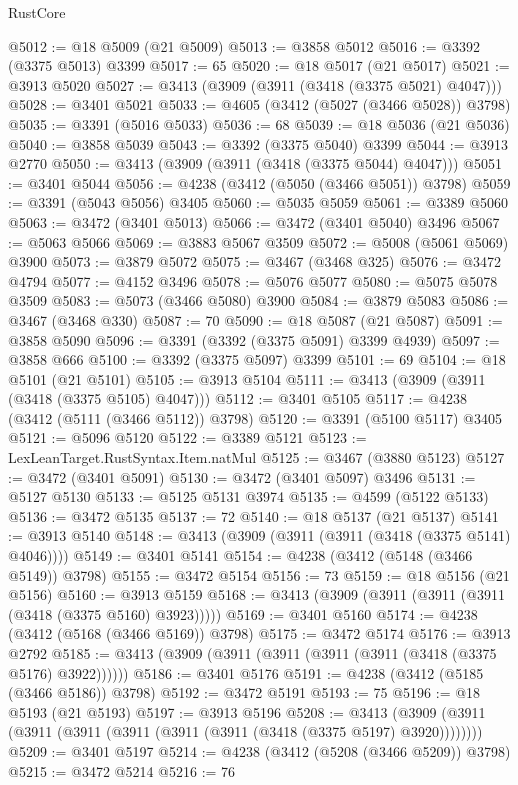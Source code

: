 \begin{lexlean}{RustCore}
\begin{coremodule}
@5012 := @18 @5009 (@21 @5009)
@5013 := @3858 @5012
@5016 := @3392 (@3375 @5013) @3399
@5017 := 65
@5020 := @18 @5017 (@21 @5017)
@5021 := @3913 @5020
@5027 := @3413 (@3909 (@3911 (@3418 (@3375 @5021) @4047)))
@5028 := @3401 @5021
@5033 := @4605 (@3412 (@5027 (@3466 @5028)) @3798)
@5035 := @3391 (@5016 @5033)
@5036 := 68
@5039 := @18 @5036 (@21 @5036)
@5040 := @3858 @5039
@5043 := @3392 (@3375 @5040) @3399
@5044 := @3913 @2770
@5050 := @3413 (@3909 (@3911 (@3418 (@3375 @5044) @4047)))
@5051 := @3401 @5044
@5056 := @4238 (@3412 (@5050 (@3466 @5051)) @3798)
@5059 := @3391 (@5043 @5056) @3405
@5060 := @5035 @5059
@5061 := @3389 @5060
@5063 := @3472 (@3401 @5013)
@5066 := @3472 (@3401 @5040) @3496
@5067 := @5063 @5066
@5069 := @3883 @5067 @3509
@5072 := @5008 (@5061 @5069) @3900
@5073 := @3879 @5072
@5075 := @3467 (@3468 @325)
@5076 := @3472 @4794
@5077 := @4152 @3496
@5078 := @5076 @5077
@5080 := @5075 @5078 @3509
@5083 := @5073 (@3466 @5080) @3900
@5084 := @3879 @5083
@5086 := @3467 (@3468 @330)
@5087 := 70
@5090 := @18 @5087 (@21 @5087)
@5091 := @3858 @5090
@5096 := @3391 (@3392 (@3375 @5091) @3399 @4939)
@5097 := @3858 @666
@5100 := @3392 (@3375 @5097) @3399
@5101 := 69
@5104 := @18 @5101 (@21 @5101)
@5105 := @3913 @5104
@5111 := @3413 (@3909 (@3911 (@3418 (@3375 @5105) @4047)))
@5112 := @3401 @5105
@5117 := @4238 (@3412 (@5111 (@3466 @5112)) @3798)
@5120 := @3391 (@5100 @5117) @3405
@5121 := @5096 @5120
@5122 := @3389 @5121
@5123 := LexLeanTarget.RustSyntax.Item.natMul
@5125 := @3467 (@3880 @5123)
@5127 := @3472 (@3401 @5091)
@5130 := @3472 (@3401 @5097) @3496
@5131 := @5127 @5130
@5133 := @5125 @5131 @3974
@5135 := @4599 (@5122 @5133)
@5136 := @3472 @5135
@5137 := 72
@5140 := @18 @5137 (@21 @5137)
@5141 := @3913 @5140
@5148 := @3413 (@3909 (@3911 (@3911 (@3418 (@3375 @5141) @4046))))
@5149 := @3401 @5141
@5154 := @4238 (@3412 (@5148 (@3466 @5149)) @3798)
@5155 := @3472 @5154
@5156 := 73
@5159 := @18 @5156 (@21 @5156)
@5160 := @3913 @5159
@5168 := @3413 (@3909 (@3911 (@3911 (@3911 (@3418 (@3375 @5160) @3923)))))
@5169 := @3401 @5160
@5174 := @4238 (@3412 (@5168 (@3466 @5169)) @3798)
@5175 := @3472 @5174
@5176 := @3913 @2792
@5185 := @3413 (@3909 (@3911 (@3911 (@3911 (@3911 (@3418 (@3375 @5176) @3922))))))
@5186 := @3401 @5176
@5191 := @4238 (@3412 (@5185 (@3466 @5186)) @3798)
@5192 := @3472 @5191
@5193 := 75
@5196 := @18 @5193 (@21 @5193)
@5197 := @3913 @5196
@5208 := @3413 (@3909 (@3911 (@3911 (@3911 (@3911 (@3911 (@3911 (@3418 (@3375 @5197) @3920))))))))
@5209 := @3401 @5197
@5214 := @4238 (@3412 (@5208 (@3466 @5209)) @3798)
@5215 := @3472 @5214
@5216 := 76

\end{coremodule}
\end{lexlean}
